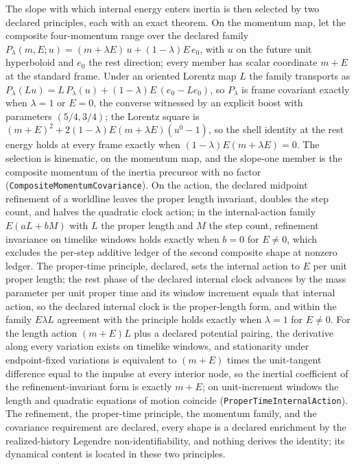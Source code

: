 \documentclass[11pt]{article}
\begin{document}
The slope with which internal energy enters inertia is then selected by
two declared principles, each with an exact theorem. On the momentum map,
let the composite four-momentum range over the declared family
\(P_\lambda(m,E;u)=(m+\lambda E)\,u+(1-\lambda)E\,e_0\), with \(u\) on the
future unit hyperboloid and \(e_0\) the rest direction; every member has
scalar coordinate \(m+E\) at the standard frame. Under an oriented Lorentz
map \(L\) the family transports as
\(P_\lambda(Lu)=L\,P_\lambda(u)+(1-\lambda)E\,(e_0-Le_0)\), so
\(P_\lambda\) is frame covariant exactly when \(\lambda=1\) or \(E=0\), the
converse witnessed by an explicit boost with parameters \((5/4,3/4)\); the
Lorentz square is \((m+E)^2+2(1-\lambda)E(m+\lambda E)(u^0-1)\), so the
shell identity at the rest energy holds at every frame exactly when
\((1-\lambda)E(m+\lambda E)=0\). The selection is kinematic, on the
momentum map, and the slope-one member is the composite momentum of the
inertia precursor with no factor
(\texttt{CompositeMomentumCovariance}). On the action, the
declared midpoint refinement of a worldline leaves the proper length
invariant, doubles the step count, and halves the quadratic clock action;
in the internal-action family \(E(aL+bM)\) with \(L\) the proper length
and \(M\) the step count, refinement invariance on timelike windows holds
exactly when \(b=0\) for \(E\ne0\), which excludes the per-step additive
ledger of the second composite shape at nonzero ledger. The proper-time
principle, declared, sets the
internal action to \(E\) per unit proper length; the rest phase of the
declared internal clock advances by the mass parameter per unit proper
time and its window increment equals that internal action, so the declared
internal clock is the proper-length form, and within the family
\(E\lambda L\) agreement with the principle holds exactly when
\(\lambda=1\) for \(E\ne0\). For the length action \((m+E)L\) plus a declared potential
pairing, the derivative along every variation exists on timelike windows,
and stationarity under endpoint-fixed variations is equivalent to
\((m+E)\) times the unit-tangent difference equal to the impulse at every
interior node, so the inertial coefficient of the refinement-invariant
form is exactly \(m+E\); on unit-increment windows the length and
quadratic equations of motion coincide
(\texttt{ProperTimeInternalAction}). The refinement, the
proper-time principle, the momentum family, and the covariance requirement
are declared, every shape is a declared enrichment by the realized-history
Legendre non-identifiability, and nothing derives the identity; its
dynamical content is located in these two principles.
\end{document}
